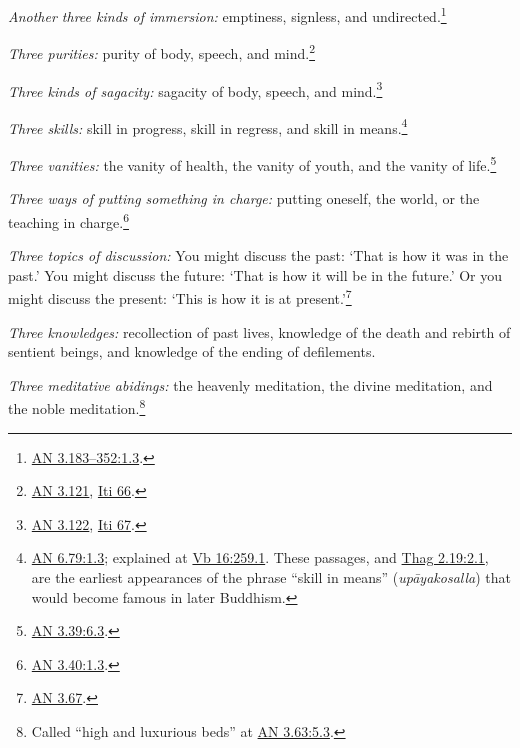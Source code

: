 \documentclass[12pt,openany]{book}%
\begin{document}
\emph{Another three kinds of immersion:} emptiness, signless, and undirected.\footnote{\href{https://suttacentral.net/an3.183-352/en/sujato\#1.3}{AN 3.183–352:1.3}. } 

\emph{Three purities:} purity of body, speech, and mind.\footnote{\href{https://suttacentral.net/an3.121/en/sujato}{AN 3.121}, \href{https://suttacentral.net/iti66/en/sujato}{Iti 66}. } 

\emph{Three kinds of sagacity:} sagacity of body, speech, and mind.\footnote{\href{https://suttacentral.net/an3.122/en/sujato}{AN 3.122}, \href{https://suttacentral.net/iti67/en/sujato}{Iti 67}. } 

\emph{Three skills:} skill in progress, skill in regress, and skill in means.\footnote{\href{https://suttacentral.net/an6.79/en/sujato\#1.3}{AN 6.79:1.3}; explained at \href{https://suttacentral.net/vb16/en/sujato\#259.1}{Vb 16:259.1}. These passages, and \href{https://suttacentral.net/thag2.19/en/sujato\#2.1}{Thag 2.19:2.1}, are the earliest appearances of the phrase “skill in means” (\textit{\textsanskrit{upāyakosalla}}) that would become famous in later Buddhism. } 

\emph{Three vanities:} the vanity of health, the vanity of youth, and the vanity of life.\footnote{\href{https://suttacentral.net/an3.39/en/sujato\#6.3}{AN 3.39:6.3}. } 

\emph{Three ways of putting something in charge:} putting oneself, the world, or the teaching in charge.\footnote{\href{https://suttacentral.net/an3.40/en/sujato\#1.3}{AN 3.40:1.3}. } 

\emph{Three topics of discussion:} You might discuss the past: ‘That is how it was in the past.’ You might discuss the future: ‘That is how it will be in the future.’ Or you might discuss the present: ‘This is how it is at present.’\footnote{\href{https://suttacentral.net/an3.67/en/sujato}{AN 3.67}. } 

\emph{Three knowledges:} recollection of past lives, knowledge of the death and rebirth of sentient beings, and knowledge of the ending of defilements. 

\emph{Three meditative abidings:} the heavenly meditation, the divine meditation, and the noble meditation.\footnote{Called “high and luxurious beds” at \href{https://suttacentral.net/an3.63/en/sujato\#5.3}{AN 3.63:5.3}. } 
\end{document}

